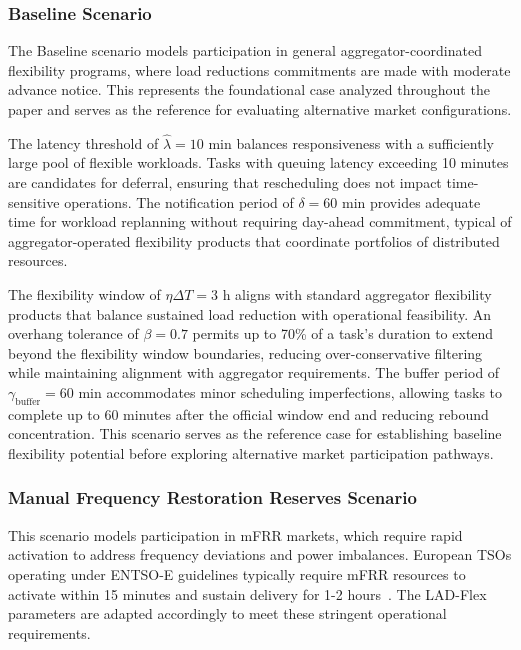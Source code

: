 \documentclass[preprint,12pt]{elsarticle}
\begin{document}
\subsubsection{Baseline Scenario}
The Baseline scenario models participation in general aggregator-coordinated flexibility programs, where load reductions commitments are made with moderate advance notice. This represents the foundational case analyzed throughout the paper and serves as the reference for evaluating alternative market configurations.

The latency threshold of $\hat{\lambda} = 10$ min balances responsiveness with a sufficiently large pool of flexible workloads. Tasks with queuing latency exceeding 10 minutes are candidates for deferral, ensuring that rescheduling does not impact time-sensitive operations. The notification period of $\delta = 60$ min provides adequate time for workload replanning without requiring day-ahead commitment, typical of aggregator-operated flexibility products that coordinate portfolios of distributed resources.

The flexibility window of $\eta\Delta T = 3$ h aligns with standard aggregator flexibility products that balance sustained load reduction with operational feasibility. An overhang tolerance of $\beta = 0.7$ permits up to 70\% of a task's duration to extend beyond the flexibility window boundaries, reducing over-conservative filtering while maintaining alignment with aggregator requirements. The buffer period of $\gamma_{\text{buffer}} = 60$ min accommodates minor scheduling imperfections, allowing tasks to complete up to 60 minutes after the official window end and reducing rebound concentration. This scenario serves as the reference case for establishing baseline flexibility potential before exploring alternative market participation pathways.

\subsubsection{Manual Frequency Restoration Reserves Scenario}

This scenario models participation in mFRR markets, which require rapid activation to address frequency deviations and power imbalances. European TSOs operating under ENTSO-E guidelines typically require mFRR resources to activate within 15 minutes and sustain delivery for 1-2 hours~\cite{ENTSOE_MARI_IG_v1_7}. The LAD-Flex parameters are adapted accordingly to meet these stringent operational requirements.
\end{document}
